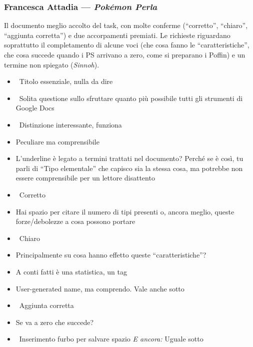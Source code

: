 \subsubsection{Francesca Attadia --- \emph{Pokémon Perla}}
Il documento meglio accolto del task, con molte conferme (``corretto'',
``chiaro'', ``aggiunta corretta'') e due accorpamenti premiati. Le richieste
riguardano soprattutto il completamento di alcune voci (che cosa fanno le
``caratteristiche'', che cosa succede quando i PS arrivano a zero, come si
preparano i Poffin) e un termine non spiegato (\emph{Sinnoh}).
{\small
\begin{itemize}
  \item {} \rvBene\ Titolo essenziale, nulla da dire
  \item \rvVuoto\ Solita questione sullo sfruttare quanto più possibile tutti gli strumenti di Google Docs
  \item {} \rvBene\ Distinzione interessante, funziona
  \item {} Peculiare ma comprensibile
  \item {} L'underline è legato a termini trattati nel documento? Perché se è così, tu parli di ``Tipo elementale'' che capisco sia la stessa cosa, ma potrebbe non essere comprensibile per un lettore disattento
  \item {} \rvBene\ Corretto
  \item {} Hai spazio per citare il numero di tipi presenti o, ancora meglio, queste forze/debolezze a cosa possono portare
  \item {} \rvBene\ Chiaro
  \item {} Principalmente su cosa hanno effetto queste ``caratteristiche''?
  \item {} A conti fatti è una statistica, un tag
  \item {} User-generated name, ma comprendo. Vale anche sotto
  \item {} \rvBene\ Aggiunta corretta
  \item {} Se va a zero che succede?
  \item {} \rvBene\ Inserimento furbo per salvare spazio \emph{E ancora:} Uguale sotto

\end{itemize}}
